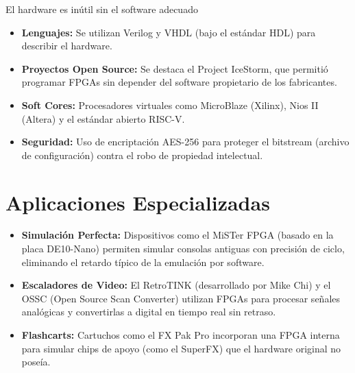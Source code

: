 \documentclass[a4paper,12pt]{article}
\begin{document}
El hardware es inútil sin el software adecuado

\begin{itemize}
	\item \textbf{Lenguajes:} Se utilizan Verilog y VHDL (bajo el estándar HDL) para describir el hardware.
	\item \textbf{Proyectos Open Source:} Se destaca el Project IceStorm, que permitió programar FPGAs sin depender del software propietario de los fabricantes.
	\item \textbf{Soft Cores:} Procesadores virtuales como MicroBlaze (Xilinx), Nios II (Altera) y el estándar abierto RISC-V.
	\item \textbf{Seguridad:} Uso de encriptación AES-256 para proteger el bitstream (archivo de configuración) contra el robo de propiedad intelectual.
	
\end{itemize}





\section*{Aplicaciones Especializadas}
	
\begin{itemize}
	
	\item \textbf{Simulación Perfecta:} Dispositivos como el MiSTer FPGA (basado en la placa DE10-Nano) permiten simular consolas antiguas con precisión de ciclo, eliminando el retardo típico de la emulación por software.
	
	\item \textbf{Escaladores de Video:} El RetroTINK (desarrollado por Mike Chi) y el OSSC (Open Source Scan Converter) utilizan FPGAs para procesar señales analógicas y convertirlas a digital en tiempo real sin retraso.
	
	\item \textbf{Flashcarts:} Cartuchos como el FX Pak Pro incorporan una FPGA interna para simular chips de apoyo (como el SuperFX) que el hardware original no poseía.
	
\end{itemize}
\end{document}
